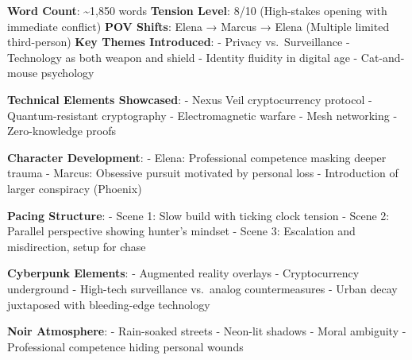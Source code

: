 \textbf{Word Count}: \textasciitilde1,850 words \textbf{Tension Level}: 8/10 (High-stakes opening with immediate conflict) \textbf{POV Shifts}: Elena → Marcus → Elena (Multiple limited third-person) \textbf{Key Themes Introduced}: - Privacy vs.~Surveillance - Technology as both weapon and shield - Identity fluidity in digital age - Cat-and-mouse psychology

\textbf{Technical Elements Showcased}: - Nexus Veil cryptocurrency protocol - Quantum-resistant cryptography - Electromagnetic warfare - Mesh networking - Zero-knowledge proofs

\textbf{Character Development}: - Elena: Professional competence masking deeper trauma - Marcus: Obsessive pursuit motivated by personal loss - Introduction of larger conspiracy (Phoenix)

\textbf{Pacing Structure}: - Scene 1: Slow build with ticking clock tension - Scene 2: Parallel perspective showing hunter's mindset - Scene 3: Escalation and misdirection, setup for chase

\textbf{Cyberpunk Elements}: - Augmented reality overlays - Cryptocurrency underground - High-tech surveillance vs.~analog countermeasures - Urban decay juxtaposed with bleeding-edge technology

\textbf{Noir Atmosphere}: - Rain-soaked streets - Neon-lit shadows - Moral ambiguity - Professional competence hiding personal wounds
